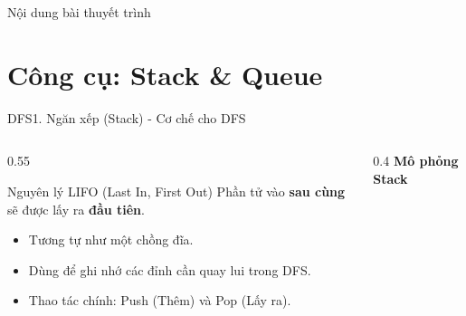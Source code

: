 \begin{frame}{Nội dung bài thuyết trình}
    \tableofcontents
\end{frame}

\section{Công cụ: Stack \& Queue}
\begin{frame}[fragile]{DFS}{1. Ngăn xếp (Stack) - Cơ chế cho DFS}
    \begin{columns}
        \begin{column}{0.55\textwidth}
            \begin{block}{Nguyên lý LIFO (Last In, First Out)}
                Phần tử vào \textbf{sau cùng} sẽ được lấy ra \textbf{đầu tiên}.
            \end{block}
            \begin{itemize}
                \item Tương tự như một chồng đĩa.
                \item Dùng để ghi nhớ các đỉnh cần quay lui trong DFS.
                \item Thao tác chính: Push (Thêm) và Pop (Lấy ra).
            \end{itemize}
        \end{column}
        \begin{column}{0.4\textwidth}
            \centering \textbf{Mô phỏng Stack}\\
        \end{column}
    \end{columns}
\end{frame}

